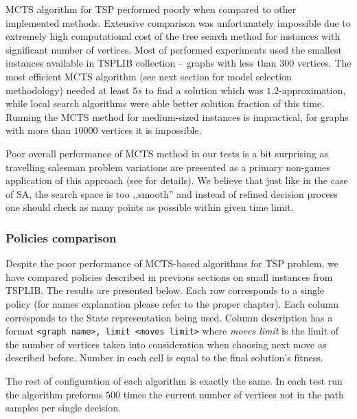 MCTS algorithm for TSP performed poorly when compared to other implemented
methods. Extensive comparison was unfortunately impossible due to extremely
high computational cost of the tree search method for instances with
significant number of vertices. Most of performed experiments used the smallest
instances available in TSPLIB collection -- graphs with less than $300$
vertices. The most efficient MCTS algorithm (see next section for model
selection methodology) needed at least $5 s$ to find a solution which was
$1.2$-approximation, while local search algorithms were able better solution
fraction of this time. Running the MCTS method for medium-sized instances is
impractical, for graphs with more than $10000$ vertices it is impossible.

Poor overall performance of MCTS method in our tests is a bit surprising as
travelling salesman problem variations are presented as a primary non-games
application of this approach (see \cite{MCTSsurvey} for details). We believe
that just like in the case of SA, the search space is too ,,smooth'' and
instead of refined decision process one should check as many points as possible
within given time limit.

\subsubsection{Policies comparison}

Despite the poor performance of MCTS-based algorithms for TSP problem, we have
compared policies described in previous sections on small instances from
TSPLIB. The results are presented below. Each row corresponds to a single
policy (for names explanation please refer to the proper chapter). Each column
corresponds to the State representation being used. Column description has a
format \verb+<graph name>, limit <moves limit>+ where \emph{moves limit} is
the limit of the number of vertices taken into consideration when choosing next
move as described before. Number in each cell is equal to the final solution's
fitness.

The rest of configuration of each algorithm is exactly the same. In each test
run the algorithm preforms $500$ times the current number of vertices not in
the path samples per single decision.

\begin{figure}[ht]
  \centering
  
\end{figure}

\begin{figure}[ht]
  \centering
  
\end{figure}

